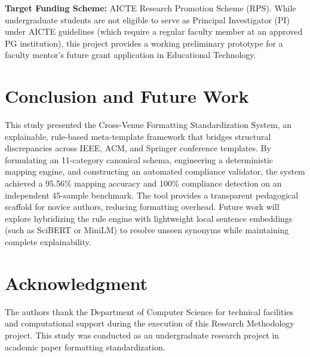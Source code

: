 \documentclass[conference]{IEEEtran}
\begin{document}
\textbf{Target Funding Scheme:} AICTE Research Promotion Scheme (RPS). While undergraduate students are not eligible to serve as Principal Investigator (PI) under AICTE guidelines (which require a regular faculty member at an approved PG institution), this project provides a working preliminary prototype for a faculty mentor's future grant application in Educational Technology.

\section{Conclusion and Future Work}
This study presented the Cross-Venue Formatting Standardization System, an explainable, rule-based meta-template framework that bridges structural discrepancies across IEEE, ACM, and Springer conference templates. By formulating an 11-category canonical schema, engineering a deterministic mapping engine, and constructing an automated compliance validator, the system achieved a 95.56\% mapping accuracy and 100\% compliance detection on an independent 45-sample benchmark. The tool provides a transparent pedagogical scaffold for novice authors, reducing formatting overhead. Future work will explore hybridizing the rule engine with lightweight local sentence embeddings (such as SciBERT or MiniLM) to resolve unseen synonyms while maintaining complete explainability.

\section*{Acknowledgment}
The authors thank the Department of Computer Science for technical facilities and computational support during the execution of this Research Methodology project. This study was conducted as an undergraduate research project in academic paper formatting standardization.
\end{document}
